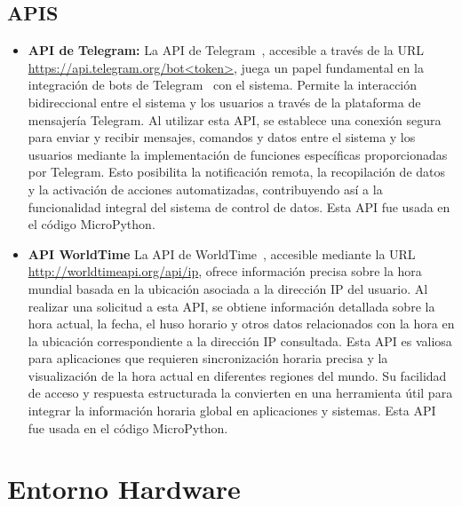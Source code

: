 \subsection{APIS}\label{4:APIS}
\begin{itemize}
    \item \textbf{API de Telegram:}
La API de Telegram~\cite{misc:Telegram_api}, accesible a través de la URL \url{https://api.telegram.org/bot<token>}, juega un papel fundamental en la integración de bots de Telegram~\cite{misc:Telegram_bots} con el sistema. Permite la interacción bidireccional entre el sistema y los usuarios a través de la plataforma de mensajería Telegram. Al utilizar esta API, se establece una conexión segura para enviar y recibir mensajes, comandos y datos entre el sistema y los usuarios mediante la implementación de funciones específicas proporcionadas por Telegram. Esto posibilita la notificación remota, la recopilación de datos y la activación de acciones automatizadas, contribuyendo así a la funcionalidad integral del sistema de control de datos.
Esta API fue usada en el código MicroPython.
    \item \textbf{API WorldTime}\label{4:API_Hora}
		La API de WorldTime~\cite{misc:WorlTimeAPI}, accesible mediante la URL \url{http://worldtimeapi.org/api/ip}, ofrece información precisa sobre la hora mundial basada en la ubicación asociada a la dirección IP del usuario. Al realizar una solicitud a esta API, se obtiene información detallada sobre la hora actual, la fecha, el huso horario y otros datos relacionados con la hora en la ubicación correspondiente a la dirección IP consultada. Esta API es valiosa para aplicaciones que requieren sincronización horaria precisa y la visualización de la hora actual en diferentes regiones del mundo. Su facilidad de acceso y respuesta estructurada la convierten en una herramienta útil para integrar la información horaria global en aplicaciones y sistemas.
Esta API fue usada en el código MicroPython.
\end{itemize}
\pagebreak

\section{Entorno Hardware}
